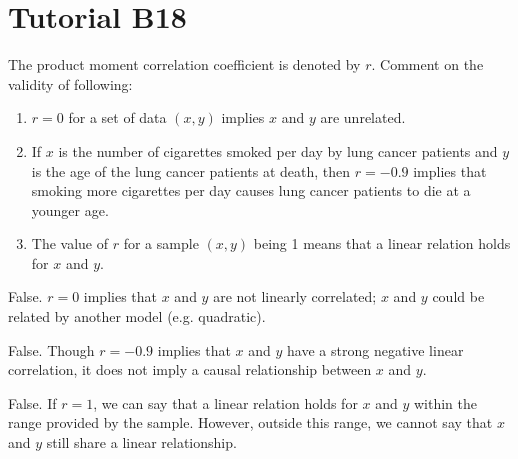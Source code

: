 \section{Tutorial B18}

\begin{problem}
    The product moment correlation coefficient is denoted by $r$. Comment on the validity of following:

    \begin{enumerate}
        \item $r=0$ for a set of data $(x,y)$ implies $x$ and $y$ are unrelated.
        \item If $x$ is the number of cigarettes smoked per day by lung cancer patients and $y$ is the age of the lung cancer patients at death, then $r=-0.9$ implies that smoking more cigarettes per day causes lung cancer patients to die at a younger age.
        \item The value of $r$ for a sample $(x,y)$ being 1 means that a linear relation holds for $x$ and $y$.
    \end{enumerate}
\end{problem}
\begin{solution}
    \begin{ppart}
        False. $r = 0$ implies that $x$ and $y$ are not linearly correlated; $x$ and $y$ could be related by another model (e.g. quadratic).
    \end{ppart}
    \begin{ppart}
        False. Though $r = -0.9$ implies that $x$ and $y$ have a strong negative linear correlation, it does not imply a causal relationship between $x$ and $y$.
    \end{ppart}
    \begin{ppart}
        False. If $r = 1$, we can say that a linear relation holds for $x$ and $y$ within the range provided by the sample. However, outside this range, we cannot say that $x$ and $y$ still share a linear relationship.
    \end{ppart}
\end{solution}


